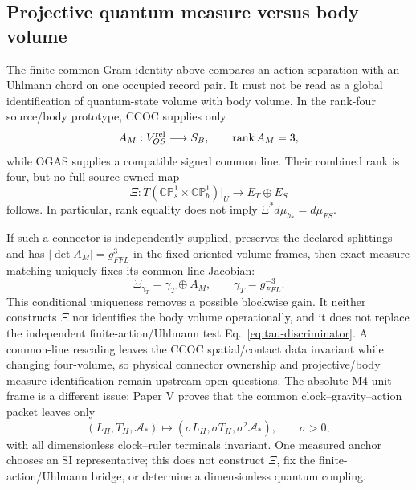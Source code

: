 \documentclass[11pt]{article}
\begin{document}
\subsection{Projective quantum measure versus body volume}

The finite common-Gram identity above compares an action separation with an
Uhlmann chord on one occupied record pair.  It must not be read as a global
identification of quantum-state volume with body volume.  In the rank-four
source/body prototype, CCOC supplies only
\begin{equation}
 A_M:V_{OS}^{\rm rel}\longrightarrow S_B,
 \qquad \operatorname{rank}A_M=3,
 \label{eq:quantum-imported-ccoc-map}
\end{equation}
while OGAS supplies a compatible signed common line.  Their combined rank is
four, but no full source-owned map
\begin{equation}
 \Xi:T(\mathbb{CP}^{1}_{s}\times\mathbb{CP}^{1}_{b})|_U
 \longrightarrow E_T\oplus E_S
 \label{eq:quantum-projective-body-map}
\end{equation}
follows.  In particular, rank equality does not imply
$\Xi^*d\mu_{h_*}=d\mu_{FS}$.

If such a connector is independently supplied, preserves the declared
splittings and has $|\det A_M|=g_{FFL}^{3}$ in the fixed oriented volume
frames, then exact measure matching uniquely fixes its common-line Jacobian:
\begin{equation}
 \Xi_{\gamma_T}=\gamma_T\oplus A_M,
 \qquad \gamma_T=g_{FFL}^{-3}.
 \label{eq:quantum-conditional-measure-normalization}
\end{equation}
This conditional uniqueness removes a possible blockwise gain.  It neither
constructs $\Xi$ nor identifies the body volume operationally, and it does not
replace the independent finite-action/Uhlmann test
Eq.~\eqref{eq:tau-discriminator}.  A common-line rescaling leaves the CCOC
spatial/contact data invariant while changing four-volume, so physical
connector ownership and projective/body measure identification remain
upstream open questions. The absolute M4 unit frame is a different issue:
Paper V proves that the common clock--gravity--action packet leaves only
\begin{equation}
 (L_H,T_H,\mathcal A_*)
 \longmapsto
 (\sigma L_H,\sigma T_H,\sigma^2\mathcal A_*),
 \qquad \sigma>0,
 \label{eq:quantum-inherited-m4-metrology}
\end{equation}
with all dimensionless clock--ruler terminals invariant. One measured anchor
chooses an SI representative; this does not construct $\Xi$, fix the
finite-action/Uhlmann bridge, or determine a dimensionless quantum coupling.
\end{document}
